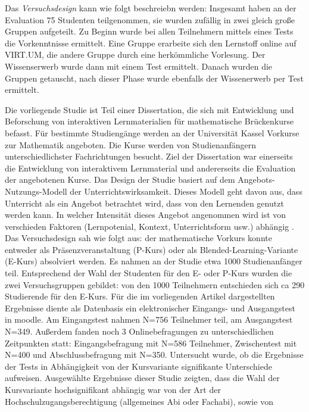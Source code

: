 \documentclass[12pt, bibliography=totoc]{scrartcl}
\begin{document}
Das \emph{Versuchsdesign} kann wie folgt beschreiebn werden: Insgesamt
haben an der Evaluation 75 Studenten teilgenommen, sie wurden zufällig
in zwei gleich große Gruppen aufgeteilt. Zu Beginn wurde bei allen
Teilnehmern mittels eines Tests die Vorkenntnisse ermittelt. Eine Gruppe
erarbeite sich den Lernstoff online auf VIRT.UM, die andere Gruppe durch
eine herkömmliche Vorlesung. Der Wissenserwerb wurde dann mit einem Test
ermittelt. Danach wurden die Gruppen getauscht, nach dieser Phase wurde
ebenfalls der Wissenerwerb per Test ermittelt.

\textbf{}

Die vorliegende Studie ist Teil einer Dissertation, die sich mit
Entwicklung und Beforschung von interaktiven Lernmaterialien für
mathematische Brückenkurse befasst. Für bestimmte Studiengänge werden an
der Universität Kassel Vorkurse zur Mathematik angeboten. Die Kurse
werden von Studienanfängern unterschiedlichster Fachrichtungen besucht.
Ziel der Dissertation war einerseits die Entwicklung von interaktivem
Lernmaterial und andererseits die Evaluation der angebotenen Kurse. Das
Design der Studie basiert auf dem Angebots-Nutzungs-Modell der
Unterrichtswirksamkeit. Dieses Modell geht davon aus, dass Unterricht
als ein Angebot betrachtet wird, dass von den Lernenden genutzt werden
kann. In welcher Intensität dieses Angebot angenommen wird ist von
verschieden Faktoren (Lernpotenial, Kontext, Unterrichtsform usw.)
abhängig \parencite{Helmke2008}. Das Versuchsdesign sah wie folgt aus:
der mathematische Vorkurs konnte entweder als Präsenzveranstaltung
(P-Kurs) oder als Blended-Learning-Variante (E-Kurs) absolviert werden.
Es nahmen an der Studie etwa 1000 Studienanfänger teil. Entsprechend der
Wahl der Studenten für den E- oder P-Kurs wurden die zwei
Versuchsgruppen gebildet: von den 1000 Teilnehmern entschieden sich ca
290 Studierende für den E-Kurs. Für die im vorliegenden Artikel
dargestellten Ergebnisse diente als Datenbasis ein elektronischer
Eingangs- und Ausgangstest in moodle. Am Eingangstest nahmen N=756
Teilnehmer teil, am Ausgangstest N=349. Außerdem fanden noch 3
Onlinebefragungen zu unterschiedlichen Zeitpunkten statt:
Eingangsbefragung mit N=586 Teilnehmer, Zwischentest mit N=400 und
Abschlussbefragung mit N=350. Untersucht wurde, ob die Ergebnisse der
Tests in Abhängigkeit von der Kursvariante signifikante Unterschiede
aufweisen. Ausgewählte Ergebnisse dieser Studie zeigten, dass die Wahl
der Kursvariante hochsignifikant abhängig war von der Art der
Hochschulzugangsberechtigung (allgemeines Abi oder Fachabi), sowie von
\end{document}
